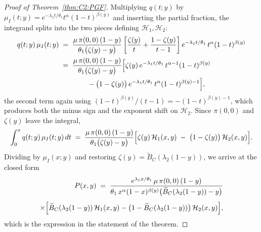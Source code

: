 \begin{proof}[Proof of Theorem~\ref{thm:C2:PGF}]
Multiplying $q(t;y)$ by $\mu_I(t;y)=e^{-\lambda_1 t/\theta_1}t^{\alpha}(1-t)^{\beta(y)}$ and inserting the partial fraction, the integrand splits into the two pieces defining $\mathcal{H}_1,\mathcal{H}_2$:
\begin{align*}
    q(t;y)\,\mu_I(t;y)
    &\;=\; \frac{\mu\,\pi(0,0)\,(1-y)}{\theta_1\bigl(\zeta(y)-y\bigr)}
      \left[\frac{\zeta(y)}{t} + \frac{1-\zeta(y)}{t-1}\right]
      e^{-\lambda_1 t/\theta_1}\,t^{\alpha}(1-t)^{\beta(y)} \\
    &\;=\; \frac{\mu\,\pi(0,0)\,(1-y)}{\theta_1\bigl(\zeta(y)-y\bigr)}
      \Bigl[\zeta(y)\,e^{-\lambda_1 t/\theta_1}\,t^{\alpha-1}(1-t)^{\beta(y)} \\
    &\qquad\qquad
      - \bigl(1-\zeta(y)\bigr)\,e^{-\lambda_1 t/\theta_1}\,t^{\alpha}(1-t)^{\beta(y)-1}\Bigr],
\end{align*}
the second term again using $(1-t)^{\beta(y)}/(t-1)=-(1-t)^{\beta(y)-1}$, which produces both the minus sign and the exponent shift on $\mathcal{H}_2$. Since $\pi(0,0)$ and $\zeta(y)$ leave the integral,
\begin{equation*}
    \int_0^x q(t;y)\,\mu_I(t;y)\,dt \;=\; \frac{\mu\,\pi(0,0)\,(1-y)}{\theta_1\bigl(\zeta(y)-y\bigr)}\Bigl[\zeta(y)\,\mathcal{H}_1(x,y) \;-\; \bigl(1-\zeta(y)\bigr)\,\mathcal{H}_2(x,y)\Bigr].
\end{equation*}
Dividing by $\mu_I(x;y)$ and restoring $\zeta(y)=\widetilde{B}_C(\lambda_2(1-y))$, we arrive at the closed form
\begin{align}
    \begin{split}
        P(x,y) \;=\; \frac{e^{\lambda_1 x/\theta_1}\,\mu\,\pi(0,0)\,(1-y)}{\theta_1\, x^{\alpha}(1-x)^{\beta(y)}\bigl(\widetilde{B}_C(\lambda_2(1-y))-y\bigr)}\\[4pt]
        \times \Bigl[\widetilde{B}_C(\lambda_2(1-y))\,\mathcal{H}_1(x,y) - \bigl(1-\widetilde{B}_C(\lambda_2(1-y))\bigr)\,\mathcal{H}_2(x,y)\Bigr],
    \end{split}\label{eq:C2:Pxy}
\end{align}
which is the expression in the statement of the theorem.
\end{proof}


